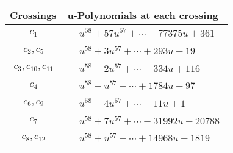 \documentclass[1p]{elsarticle_modified}
\theoremstyle{definition}
\begin{document}
\begin{tabular}{m{50pt}|m{274pt}}
Crossings & \hspace{64pt}u-Polynomials at each crossing \\
\hline $$\begin{aligned}c_{1}\end{aligned}$$&$\begin{aligned}
&u^{58}+57 u^{57}+\cdots-77375 u+361
\end{aligned}$\\
\hline $$\begin{aligned}c_{2},c_{5}\end{aligned}$$&$\begin{aligned}
&u^{58}+3 u^{57}+\cdots+293 u-19
\end{aligned}$\\
\hline $$\begin{aligned}c_{3},c_{10},c_{11}\end{aligned}$$&$\begin{aligned}
&u^{58}-2 u^{57}+\cdots-334 u+116
\end{aligned}$\\
\hline $$\begin{aligned}c_{4}\end{aligned}$$&$\begin{aligned}
&u^{58}- u^{57}+\cdots+1784 u-97
\end{aligned}$\\
\hline $$\begin{aligned}c_{6},c_{9}\end{aligned}$$&$\begin{aligned}
&u^{58}-4 u^{57}+\cdots-11 u+1
\end{aligned}$\\
\hline $$\begin{aligned}c_{7}\end{aligned}$$&$\begin{aligned}
&u^{58}+7 u^{57}+\cdots-31992 u-20788
\end{aligned}$\\
\hline $$\begin{aligned}c_{8},c_{12}\end{aligned}$$&$\begin{aligned}
&u^{58}+u^{57}+\cdots+14968 u-1819
\end{aligned}$\\
\hline
\end{tabular}\\~\\
\newpage\renewcommand{\arraystretch}{1}
\end{document}
